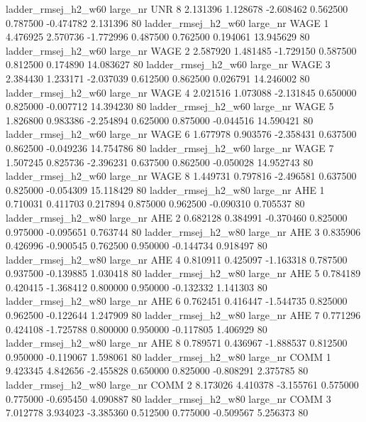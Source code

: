 ladder_rmsej_h2_w60   large_nr      UNR                 8  2.131396  1.128678  -2.608462 0.562500 0.787500 -0.474782    2.131396 80
ladder_rmsej_h2_w60   large_nr     WAGE                 1  4.476925  2.570736  -1.772996 0.487500 0.762500  0.194061   13.945629 80
ladder_rmsej_h2_w60   large_nr     WAGE                 2  2.587920  1.481485  -1.729150 0.587500 0.812500  0.174890   14.083627 80
ladder_rmsej_h2_w60   large_nr     WAGE                 3  2.384430  1.233171  -2.037039 0.612500 0.862500  0.026791   14.246002 80
ladder_rmsej_h2_w60   large_nr     WAGE                 4  2.021516  1.073088  -2.131845 0.650000 0.825000 -0.007712   14.394230 80
ladder_rmsej_h2_w60   large_nr     WAGE                 5  1.826800  0.983386  -2.254894 0.625000 0.875000 -0.044516   14.590421 80
ladder_rmsej_h2_w60   large_nr     WAGE                 6  1.677978  0.903576  -2.358431 0.637500 0.862500 -0.049236   14.754786 80
ladder_rmsej_h2_w60   large_nr     WAGE                 7  1.507245  0.825736  -2.396231 0.637500 0.862500 -0.050028   14.952743 80
ladder_rmsej_h2_w60   large_nr     WAGE                 8  1.449731  0.797816  -2.496581 0.637500 0.825000 -0.054309   15.118429 80
ladder_rmsej_h2_w80   large_nr      AHE                 1  0.710031  0.411703   0.217894 0.875000 0.962500 -0.090310    0.705537 80
ladder_rmsej_h2_w80   large_nr      AHE                 2  0.682128  0.384991  -0.370460 0.825000 0.975000 -0.095651    0.763744 80
ladder_rmsej_h2_w80   large_nr      AHE                 3  0.835906  0.426996  -0.900545 0.762500 0.950000 -0.144734    0.918497 80
ladder_rmsej_h2_w80   large_nr      AHE                 4  0.810911  0.425097  -1.163318 0.787500 0.937500 -0.139885    1.030418 80
ladder_rmsej_h2_w80   large_nr      AHE                 5  0.784189  0.420415  -1.368412 0.800000 0.950000 -0.132332    1.141303 80
ladder_rmsej_h2_w80   large_nr      AHE                 6  0.762451  0.416447  -1.544735 0.825000 0.962500 -0.122644    1.247909 80
ladder_rmsej_h2_w80   large_nr      AHE                 7  0.771296  0.424108  -1.725788 0.800000 0.950000 -0.117805    1.406929 80
ladder_rmsej_h2_w80   large_nr      AHE                 8  0.789571  0.436967  -1.888537 0.812500 0.950000 -0.119067    1.598061 80
ladder_rmsej_h2_w80   large_nr     COMM                 1  9.423345  4.842656  -2.455828 0.650000 0.825000 -0.808291    2.375785 80
ladder_rmsej_h2_w80   large_nr     COMM                 2  8.173026  4.410378  -3.155761 0.575000 0.775000 -0.695450    4.090887 80
ladder_rmsej_h2_w80   large_nr     COMM                 3  7.012778  3.934023  -3.385360 0.512500 0.775000 -0.509567    5.256373 80
